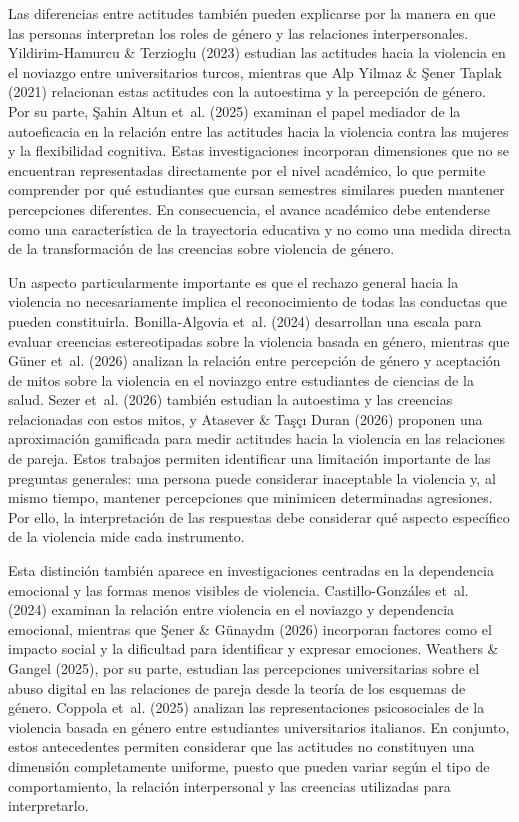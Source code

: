 \documentclass[
  spanish,
  11pt,
  letterpaper,
  DIV=11,
  numbers=noendperiod]{scrreprt}
\begin{document}
Las diferencias entre actitudes también pueden explicarse por la manera
en que las personas interpretan los roles de género y las relaciones
interpersonales. Yildirim-Hamurcu \& Terzioglu (2023) estudian las
actitudes hacia la violencia en el noviazgo entre universitarios turcos,
mientras que Alp Yilmaz \& Şener Taplak (2021) relacionan estas
actitudes con la autoestima y la percepción de género. Por su parte,
Şahin Altun et~al. (2025) examinan el papel mediador de la autoeficacia
en la relación entre las actitudes hacia la violencia contra las mujeres
y la flexibilidad cognitiva. Estas investigaciones incorporan
dimensiones que no se encuentran representadas directamente por el nivel
académico, lo que permite comprender por qué estudiantes que cursan
semestres similares pueden mantener percepciones diferentes. En
consecuencia, el avance académico debe entenderse como una
característica de la trayectoria educativa y no como una medida directa
de la transformación de las creencias sobre violencia de género.

Un aspecto particularmente importante es que el rechazo general hacia la
violencia no necesariamente implica el reconocimiento de todas las
conductas que pueden constituirla. Bonilla-Algovia et~al. (2024)
desarrollan una escala para evaluar creencias estereotipadas sobre la
violencia basada en género, mientras que Güner et~al. (2026) analizan la
relación entre percepción de género y aceptación de mitos sobre la
violencia en el noviazgo entre estudiantes de ciencias de la salud.
Sezer et~al. (2026) también estudian la autoestima y las creencias
relacionadas con estos mitos, y Atasever \& Taşçı Duran (2026) proponen
una aproximación gamificada para medir actitudes hacia la violencia en
las relaciones de pareja. Estos trabajos permiten identificar una
limitación importante de las preguntas generales: una persona puede
considerar inaceptable la violencia y, al mismo tiempo, mantener
percepciones que minimicen determinadas agresiones. Por ello, la
interpretación de las respuestas debe considerar qué aspecto específico
de la violencia mide cada instrumento.

Esta distinción también aparece en investigaciones centradas en la
dependencia emocional y las formas menos visibles de violencia.
Castillo-Gonzáles et~al. (2024) examinan la relación entre violencia en
el noviazgo y dependencia emocional, mientras que Şener \& Günaydın
(2026) incorporan factores como el impacto social y la dificultad para
identificar y expresar emociones. Weathers \& Gangel (2025), por su
parte, estudian las percepciones universitarias sobre el abuso digital
en las relaciones de pareja desde la teoría de los esquemas de género.
Coppola et~al. (2025) analizan las representaciones psicosociales de la
violencia basada en género entre estudiantes universitarios italianos.
En conjunto, estos antecedentes permiten considerar que las actitudes no
constituyen una dimensión completamente uniforme, puesto que pueden
variar según el tipo de comportamiento, la relación interpersonal y las
creencias utilizadas para interpretarlo.
\end{document}
